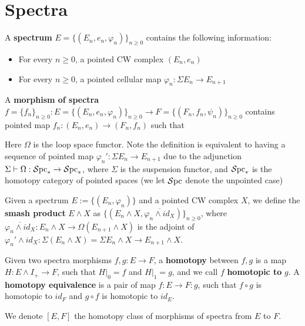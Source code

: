 \section{Spectra}\label{sec:preliminary-spectra}


\begin{definition}
    \cite{PreSwitzer}
  A \textbf{spectrum} $E=\{(E_n,e_n, \varphi_n)\}_{n\geq 0}$ contains the following information:
  \begin{itemize}
    \item For every $n\geq 0$, a pointed CW complex $(E_n, e_n)$
    \item For every $n\geq 0$, a pointed cellular map $\varphi_n: \Sigma E_n\to E_{n+1}$
  \end{itemize}
  A \textbf{morphism of spectra} $f=\{f_n\}_{n\geq 0}: E=\{(E_n,e_n, \varphi_n)\}_{n\geq 0}\to F=\{(F_n,f_n, \psi_n)\}_{n\geq 0}$ contains pointed map $f_n: (E_n,e_n)\to (F_n,f_n)$ such that 
  \begin{center}
  \end{center}
  \end{definition} Here $\Omega$ is the loop space functor. Note the definition is equivalent to having a sequence of pointed map $\varphi_n': \Sigma E_n\to E_{n+1}$ due to the adjunction $\Sigma\vdash \Omega: \operatorname{\mathcal{S}pc}_*\to \operatorname{\mathcal{S}pc}_*$, where $\Sigma$ is the suspension functor, and $\operatorname{\mathcal{S}pc}_*$ is the homotopy category of pointed spaces (we let $\operatorname{\mathcal{S}pc}$ denote the unpointed case)

\begin{definition}
    \cite{PreSwitzer}
    Given a spectrum $E:=\{(E_n, \varphi_n)\}$ and a pointed CW complex $X$, we define the \textbf{smash product} $E\wedge X$ as $\{(E_n\wedge X, \overline{\varphi_n \wedge id _X})\}_{n \geq 0}$, where $\overline{\varphi_n \wedge id _X}:E_n\wedge X\to \Omega (E_{n+1}\wedge X)$ is the adjoint of $\varphi_n' \wedge id_X: \Sigma (E_n\wedge X)=\Sigma E_n\wedge X\to E_{n+1}\wedge X$.
\end{definition}

\begin{definition}
    \cite{PreSwitzer}
    Given two spectra morphisms $f,g :E\to F$, a \textbf{homotopy} between $f,g$ is a map $H: E\wedge I_+\to F$, such that $H|_{0}=f$ and $H|_1=g$, and we call $f$ \textbf{homotopic to} $g$. A \textbf{homotopy equivalence} is a pair of map $f:E\to F: g$, such that $f\circ g$ is homotopic to $id_F$ and $g\circ f$ is homotopic to $id_E$.

    We denote $[E,F]$ the homotopy class of morphisms of spectra from $E$ to $F$.
\end{definition}

